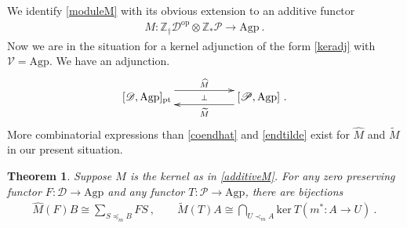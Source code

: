 \documentclass[a4paper,12pt,reqno]{amsart}
\newtheorem{theorem}{Theorem}[section] %
\theoremstyle{definition}
\theoremstyle{fact}
\theoremstyle{genquest}
\theoremstyle{step}
\newcommand{\dd}{\colon}
\newcommand{\lra}{\longrightarrow}
\newcommand{\ra}{\rightarrow}
\def\CD{{\mathscr D}}
\def\CP{{\mathscr P}}
\def\CV{{\mathscr V}}
\begin{document}
We identify \eqref{moduleM}
with its obvious extension to an additive functor
\begin{eqnarray}\label{additiveM}
M : \mathbb{Z}_{\dagger}\CD^{\mathrm{op}} \otimes \mathbb{Z}_{*}\CP \lra \mathrm{Agp} \ .
\end{eqnarray}
Now we are in the situation for a kernel adjunction of the form \eqref{keradj} with 
$\CV = \mathrm{Agp}$. We have an adjunction.
\begin{equation}\label{settingkeradj} 
\xymatrix @R-3mm {
[\CD,\mathrm{Agp}]_{\mathrm{pt}} \ar@<1.5ex>[rr]^{\widehat{M}} \ar@{}[rr]|-{\bot} && [\CP,\mathrm{Agp}]
 \ar@<1.5ex>[ll]^{\widetilde{M}} \ .
}
\end{equation}
More combinatorial expressions than \eqref{coendhat} and \eqref{endtilde} exist for $\widehat{M}$ and $\widetilde{M}$ in our present situation.
\begin{theorem}\label{combadj}
Suppose $M$ is the kernel as in \eqref{additiveM}. 
For any zero preserving functor $F\dd \CD\ra \mathrm{Agp}$ and any functor 
$T\dd \CP \ra\mathrm{Agp}$, there are bijections
\begin{eqnarray*}
\widehat{M}(F)B \cong \sum_{S\preceq_m B}{FS} \ ,
\qquad
\widetilde{M}(T)A \cong \bigcap_{U\prec_m A} {\mathrm{ker} \ {T(m^*:A\ra U)}} \ .
\end{eqnarray*}
\end{theorem}
\end{document}
